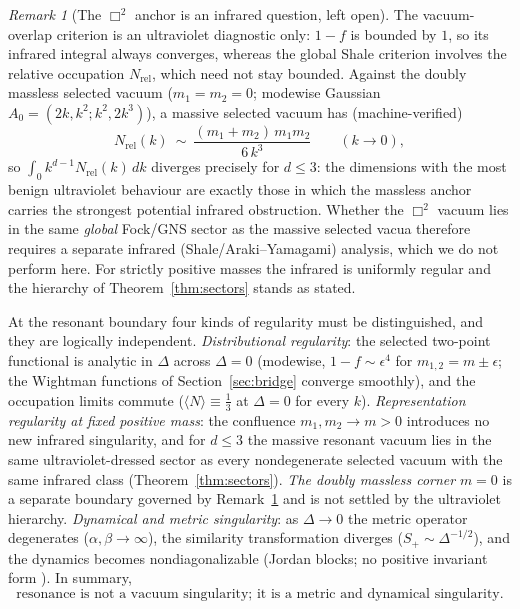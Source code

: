 \documentclass[11pt]{article}
\theoremstyle{definition}
\theoremstyle{remark}
\newtheorem{remark}[theorem]{Remark}
\begin{document}
\begin{remark}[The $\Box^2$ anchor is an infrared question, left open]
\label{rem:anchor}
The vacuum-overlap criterion is an ultraviolet diagnostic only: $1-f$ is
bounded by $1$, so its infrared integral always converges, whereas the
global Shale criterion involves the relative occupation
$N_{\mathrm{rel}}$, which need not stay bounded.  Against the doubly
massless selected vacuum ($m_1=m_2=0$; modewise Gaussian
$A_0=(2k,k^2;k^2,2k^3)$), a massive selected vacuum has (machine-verified)
\begin{equation}
N_{\mathrm{rel}}(k)\ \sim\ \frac{(m_1+m_2)\,m_1m_2}{6\,k^{3}}
\qquad(k\to0),
\end{equation}
so $\int_0k^{d-1}N_{\mathrm{rel}}(k)\,dk$ diverges precisely for
$d\le3$: the dimensions with the most benign ultraviolet behaviour are
exactly those in which the massless anchor carries the strongest
potential infrared obstruction.  Whether the $\Box^2$ vacuum lies in the
same \emph{global} Fock/GNS sector as the massive selected vacua
therefore requires a separate infrared (Shale/Araki--Yamagami) analysis,
which we do not perform here.  For strictly positive masses the infrared
is uniformly regular and the hierarchy of Theorem~\ref{thm:sectors}
stands as stated.
\end{remark}

At the resonant boundary four kinds of regularity must be
distinguished, and they are logically independent.
\emph{Distributional regularity}: the selected two-point functional is
analytic in $\Delta$ across $\Delta=0$ (modewise, $1-f\sim\epsilon^4$
for $m_{1,2}=m\pm\epsilon$; the Wightman functions of
Section~\ref{sec:bridge} converge smoothly), and the occupation limits
commute ($\langle N\rangle\equiv\tfrac13$ at $\Delta=0$ for every $k$).
\emph{Representation regularity at fixed positive mass}: the confluence
$m_1,m_2\to m>0$ introduces no new infrared singularity, and for
$d\le3$ the massive resonant vacuum lies in the same ultraviolet-dressed
sector as every nondegenerate selected vacuum with the same infrared
class (Theorem~\ref{thm:sectors}).  \emph{The doubly massless corner}
$m=0$ is a separate boundary governed by Remark~\ref{rem:anchor} and is
not settled by the ultraviolet hierarchy.
\emph{Dynamical and metric singularity}: as $\Delta\to0$ the metric
operator degenerates ($\alpha,\beta\to\infty$), the similarity
transformation diverges ($S_+\sim\Delta^{-1/2}$), and the dynamics becomes
nondiagonalizable (Jordan blocks; no positive invariant form
\cite{companion1}).  In summary,
\begin{equation}
\boxed{\ \text{resonance is not a vacuum singularity; it is a metric and
dynamical singularity.}\ }
\end{equation}
\end{document}
